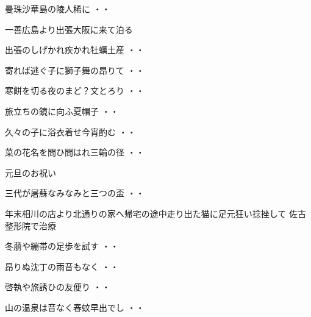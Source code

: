 \begin{shiika}曼珠沙華島の陵人稀に
\hfill{・・}\end{shiika}
\vspace{0.6cm}
一善広島より出張大阪に来て泊る
\begin{shiika}出張のしげかれ疾かれ牡蠣土産
\hfill{・・}\end{shiika}
\begin{shiika}寄れば逃ぐ子に獅子舞の昂りて
\hfill{・・}\end{shiika}
\begin{shiika}寒餅を切る夜のまど？文とろり
\hfill{・・}\end{shiika}
\begin{shiika}旅立ちの鏡に向ふ夏帽子
\hfill{・・}\end{shiika}
\begin{shiika}久々の子に浴衣着せ今宵酌む
\hfill{・・}\end{shiika}
\begin{shiika}菜の花名を問ひ問はれ三輪の径
\hfill{・・}\end{shiika}
\vspace{0.6cm}
元旦のお祝い
\begin{shiika}三代が屠蘇なみなみと三つの盃
\hfill{・・}\end{shiika}
\vspace{0.6cm}
年末相川の店より北通りの家へ帰宅の途中走り出た猫に足元狂い捻挫して
佐古整形院で治療
\begin{shiika}冬萠や繃帯の足歩を試す
\hfill{・・}\end{shiika}
\vspace{0.6cm}
\begin{shiika}昂りぬ沈丁の雨音もなく
\hfill{・・}\end{shiika}
\vspace{0.6cm}
\begin{shiika}啓執や旅誘ひの友便り
\hfill{・・}\end{shiika}
\vspace{0.6cm}
\begin{shiika}山の温泉は音なく春蚊早出でし
\hfill{・・}\end{shiika}
